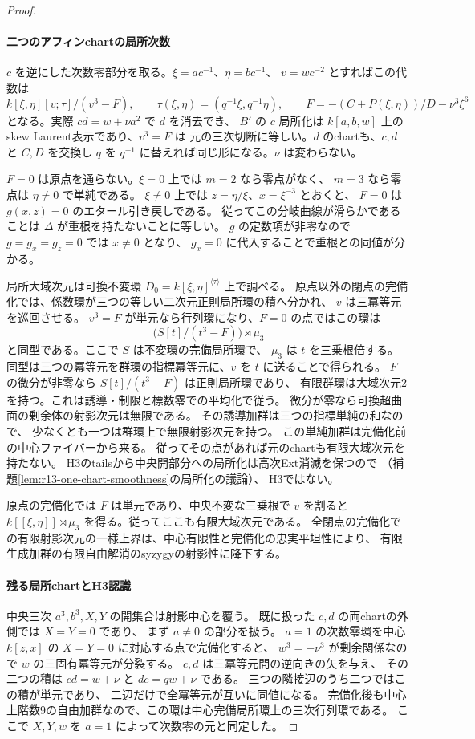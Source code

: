\begin{proof}
\paragraph{二つのアフィンchartの局所次数}
$c$ を逆にした次数零部分を取る。$\xi=ac^{-1}$、$\eta=bc^{-1}$、
$v=wc^{-2}$ とすればこの代数は
\[
 k[\xi,\eta][v;\tau]/(v^3-F),\qquad
 \tau(\xi,\eta)=(q^{-1}\xi,q^{-1}\eta),\qquad
 F=-(C+P(\xi,\eta))/D-\nu^3\xi^6
\]
となる。実際 $cd=w+\nu a^2$ で $d$ を消去でき、
$B'$ の $c$ 局所化は $k[a,b,w]$ 上のskew Laurent表示であり、$v^3=F$ は
元の三次切断に等しい。$d$ のchartも、$c,d$ と $C,D$ を交換し
$q$ を $q^{-1}$ に替えれば同じ形になる。$\nu$ は変わらない。

$F=0$ は原点を通らない。$\xi=0$ 上では $m=2$ なら零点がなく、
$m=3$ なら零点は $\eta\ne0$ で単純である。
$\xi\ne0$ 上では $z=\eta/\xi$、$x=\xi^{-3}$ とおくと、
$F=0$ は $g(x,z)=0$ のエタール引き戻しである。
従ってこの分岐曲線が滑らかであることは $\Delta$ が重根を持たないことに等しい。
$g$ の定数項が非零なので $g=g_x=g_z=0$ では $x\ne0$ となり、
$g_x=0$ に代入することで重根との同値が分かる。

局所大域次元は可換不変環 $D_0=k[\xi,\eta]^{\langle\tau\rangle}$ 上で調べる。
原点以外の閉点の完備化では、係数環が三つの等しい二次元正則局所環の積へ分かれ、
$v$ は三冪等元を巡回させる。
$v^3=F$ が単元なら行列環になり、$F=0$ の点ではこの環は
\[
 \bigl(S[t]/(t^3-F)\bigr)\rtimes\mu_3
\]
と同型である。ここで $S$ は不変環の完備局所環で、
$\mu_3$ は $t$ を三乗根倍する。
同型は三つの冪等元を群環の指標冪等元に、$v$ を $t$ に送ることで得られる。
$F$ の微分が非零なら $S[t]/(t^3-F)$ は正則局所環であり、
有限群環は大域次元2を持つ。これは誘導・制限と標数零での平均化で従う。
微分が零なら可換超曲面の剰余体の射影次元は無限である。
その誘導加群は三つの指標単純の和なので、
少なくとも一つは群環上で無限射影次元を持つ。
この単純加群は完備化前の中心ファイバーから来る。
従ってその点があれば元のchartも有限大域次元を持たない。
H3のtailsから中央開部分への局所化は高次Ext消滅を保つので
（補題\ref{lem:r13-one-chart-smoothness}の局所化の議論）、
H3ではない。

原点の完備化では $F$ は単元であり、中央不変な三乗根で $v$ を割ると
$k[[\xi,\eta]]\rtimes\mu_3$ を得る。従ってここも有限大域次元である。
全閉点の完備化での有限射影次元の一様上界は、中心有限性と完備化の忠実平坦性により、
有限生成加群の有限自由解消のsyzygyの射影性に降下する。

\paragraph{残る局所chartとH3認識}
中央三次 $a^3,b^3,X,Y$ の開集合は射影中心を覆う。
既に扱った $c,d$ の両chartの外側では $X=Y=0$ であり、
まず $a\ne0$ の部分を扱う。
$a=1$ の次数零環を中心 $k[z,x]$ の $X=Y=0$ に対応する点で完備化すると、
$w^3=-\nu^3$ が剰余関係なので $w$ の三固有冪等元が分裂する。
$c,d$ は三冪等元間の逆向きの矢を与え、
その二つの積は $cd=w+\nu$ と $dc=qw+\nu$ である。
三つの隣接辺のうち二つではこの積が単元であり、
二辺だけで全冪等元が互いに同値になる。
完備化後も中心上階数9の自由加群なので、この環は中心完備局所環上の三次行列環である。
ここで $X,Y,w$ を $a=1$ によって次数零の元と同定した。


\end{proof}
